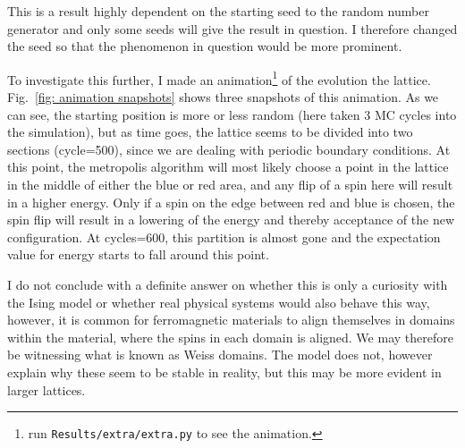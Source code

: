 \documentclass[twoside, 11pt]{article}
\begin{document}
			This is a result highly dependent on the starting seed to the random number generator and only some seeds will give the result in question. I therefore changed the seed so that the phenomenon in question would be more prominent. 
			
			To investigate this further, I made an animation\footnote{run \texttt{Results/extra/extra.py} to see the animation.} of the evolution the lattice. Fig.~\ref{fig: animation snapshots} shows three snapshots of this animation. As we can see, the starting position is more or less random (here taken 3 MC cycles into the simulation), but as time goes, the lattice seems to be divided into two sections (cycle=500), since we are dealing with periodic boundary conditions. At this point, the metropolis algorithm will most likely choose a point in the lattice in the middle of either the blue or red area, and any flip of a spin here will result in a higher energy. Only if a spin on the edge between red and blue is chosen, the spin flip will result in a lowering of the energy and thereby acceptance of the new configuration. At cycles=600, this partition is almost gone and the expectation value for energy starts to fall around this point.
			
			 I do not conclude with a definite answer on whether this is only a curiosity with the Ising model or whether real physical systems would also behave this way, however, it is common for ferromagnetic materials to align themselves in domains within the material, where the spins in each domain is aligned. We may therefore be witnessing what is known as Weiss domains. The model does not, however explain why these seem to be stable in reality, but this may be more evident in larger lattices.
			 
\end{document}
